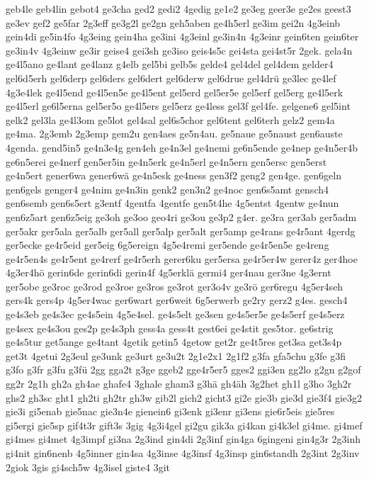 {geb4le
geb4lin
gebot4
ge3cha
ged2
gedi2
4gedig
ge1e2
ge3eg
geer3e
ge2es
geest3
ge3ev
gef2
ge5far
2g3eff
ge3g2l
ge2gn
geh5aben
ge4h5erl
ge3im
gei2n
4g3einb
gein4di
ge5in4fo
4g3eing
gein4ha
ge3ini
4g3einl
ge3in4n
4g3einr
gein6ten
gein6ter
ge3in4v
4g3einw
ge3ir
geise4
gei3sh
ge3iso
geis4s5c
gei4sta
gei4st5r
2gek.
gela4n
ge4l5ano
ge4lant
ge4lanz
g4elb
gel5bi
gelb5s
gelde4
gel4del
gel4dem
gelder4
gel6d5erh
gel6derp
gel6ders
gel6dert
gel6derw
gel6drue
gel4drü
ge3lec
ge4lef
4g3e4lek
ge4l5end
ge4l5en5e
ge4l5ent
gel5erd
gel5er5e
gel5erf
gel5erg
ge4l5erk
ge4l5erl
ge6l5erna
gel5er5o
ge4l5ers
gel5erz
ge4less
gel3f
gel4fe.
gelgene6
gel5int
gelk2
gel3la
ge4l3om
ge5lot
gel4sal
gel6s5chor
gel6tent
gel6terh
gelz2
gem4a
ge4ma.
2g3emb
2g3emp
gem2u
gen4aes
ge5n4au.
ge5naue
ge5naust
gen6auste
4genda.
gend5in5
ge4n3e4g
gen4eh
ge4n3el
ge4nemi
ge6n5ende
ge4nep
ge4n5er4b
ge6n5erei
ge4nerf
gen5er5in
ge4n5erk
ge4n5erl
ge4n5ern
gen5ersc
gen5erst
ge4n5ert
gener6wa
gener6wä
ge4n5esk
ge4ness
gen3f2
geng2
gen4ge.
gen6geln
gen6gels
genger4
ge4nim
ge4n3in
genk2
gen3n2
ge4noc
gen6s5amt
gensch4
gen6semb
gen6s5ert
g3entf
4gentfa
4gentfe
gen5t4he
4g5entst
4gentw
ge4nun
gen6z5art
gen6z5eig
ge3oh
ge3oo
geo4ri
ge3ou
ge3p2
g4er.
ge3ra
ger3ab
ger5adm
ger5akr
ger5ala
ger5alb
ger5all
ger5alp
ger5alt
ger5amp
ge4rans
ge4r5ant
4gerdg
ger5ecke
ge4r5eid
ger5eig
6g5ereign
4g5e4remi
ger5ende
ge4r5en5e
ge4reng
ge4r5en4s
ge4r5ent
ge4rerf
ge4r5erh
gerer6ku
ger5ersa
ge4r5er4w
gerer4z
ger4hoe
4g3er4hö
gerin6de
gerin6di
gerin4f
4g5erklä
germi4
ger4nau
ger3ne
4g3ernt
ger5obe
ge3roc
ge3rod
ge3roe
ge3ros
ge3rot
ger3o4v
ge3rö
ger6regu
4g5er4seh
gers4k
gers4p
4g5er4wac
ger6wart
ger6weit
6g5erwerb
ge2ry
gerz2
g4es.
gesch4
ge4s3eb
ge4s3ec
ge4s5ein
4g5e4sel.
ge4s5elt
ge3sen
ge4s5er5e
ge4s5erf
ge4s5erz
ge4sex
ge4s3ou
ges2p
ge4s3ph
gess4a
gess4t
gest6ei
ge4stit
ges5tor.
ge6strig
ge4s5tur
get5ange
ge4tant
4getik
getin5
4getow
get2r
ge4t5res
get3sa
get3s4p
get3t
4getui
2g3eul
ge3unk
ge3urt
ge3u2t
2g1e2x1
2g1f2
g3fa
gfa5chu
g3fe
g3fi
g3fo
g3fr
g3fu
g3fü
2gg
gga2t
g3ge
ggeb2
gge4r5er5
gges2
ggi3en
gg2lo
g2gn
g2gof
gg2r
2g1h
gh2a
gh4ae
ghafe4
3ghale
gham3
g3hä
gh4äh
3g2het
gh1l
g3ho
3gh2r
ghs2
gh3sc
ght1
gh2ti
gh2tr
gh3w
gib2l
gich2
gicht3
gi2e
gie3b
gie3d
gie3f4
gie3g2
gie3i
gi5enab
gie5nac
gie3n4e
gienein6
gi3enk
gi3enr
gi3ens
gie6r5eis
gie5res
gi5ergi
gie5sp
gif4t3r
gift3s
3gig
4g3i4gel
gi2gu
gik3a
gi4kan
gi4k3el
gi4me.
gi4mef
gi4mes
gi4met
4g3impf
gi3na
2g3ind
gin4di
2g3inf
gin4ga
6gingeni
gin4g3r
2g3inh
gi4nit
gin6nenb
4g5inner
gin4sa
4g3inse
4g3insf
4g3insp
gin6standh
2g3int
2g3inv
2giok
3gis
gi4sch5w
4g3isel
giste4
3git
}
